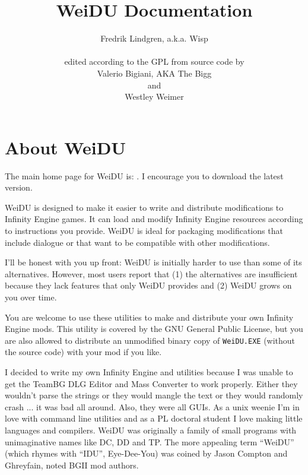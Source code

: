 \documentclass{article}
\title{WeiDU Documentation}
\author{Fredrik Lindgren, a.k.a. Wisp\\
\mailto{lindgren.fredrik@gmail.com}\\
edited according to the GPL from source code by \\
Valerio Bigiani, AKA The Bigg \\
\mailto{thebigg@spellholdstudios.net} and\\
Westley Weimer\\
\mailto{weimer@cs.berkley.edu}}
\def\ttref#1{\ahrefloc{#1}{\tt #1}}
\def\DEFINE#1{{\tt \bf #1}\label{#1}\index{#1}}
\def\t#1{{\tt #1}}
\begin{document}
\maketitle
\tableofcontents


\section{About WeiDU}

The main home page for WeiDU is:
.
I encourage you to download the latest version.

WeiDU is designed to make it easier to write and distribute modifications
to Infinity Engine games. It can load and modify Infinity Engine resources
according to instructions you provide. WeiDU is ideal for packaging
modifications that include dialogue or that want to be compatible with
other modifications.

I'll be honest with you up front: WeiDU is initially harder to use than
some of its alternatives. However, most users report that (1) the
alternatives are insufficient because they lack features that only WeiDU
provides and (2) WeiDU grows on you over time.

You are welcome to use these utilities to make and distribute your own
Infinity Engine mods. This utility is covered by the GNU General Public
License, but you are also allowed to distribute an unmodified binary copy
of \t{WeiDU.EXE} (without the source code) with your mod if you like.

I decided to write my own Infinity Engine \ttref{DLG} and \ttref{TLK}
utilities because I was unable to get the TeamBG DLG Editor and Mass
Converter to work properly. Either they wouldn't parse the strings or they
would mangle the text or they would randomly crash ... it was bad all
around. Also, they were all GUIs. As a unix weenie I'm in love with command
line utilities and as a PL doctoral student I love making little languages
and compilers.  WeiDU was originally a family of small programs with
unimaginative names like DC, DD and TP. The more appealing term ``WeiDU''
(which rhymes with ``IDU'', Eye-Dee-You) was coined by Jason Compton and
Ghreyfain, noted BGII mod authors.

\end{document}
